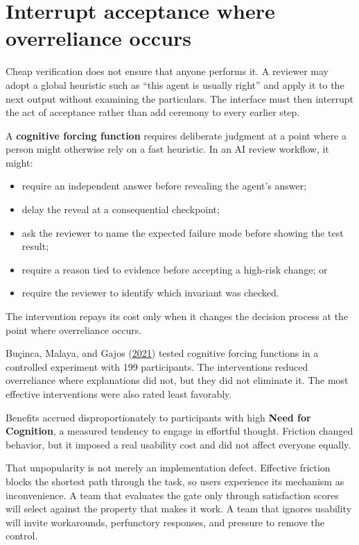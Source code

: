 \hypertarget{interrupt-acceptance-where-overreliance-occurs}{%
\section{Interrupt acceptance where overreliance occurs}\label{interrupt-acceptance-where-overreliance-occurs}}

Cheap verification does not ensure that anyone performs it. A reviewer may adopt a global heuristic such as ``this agent is usually right'' and apply it to the next output without examining the particulars. The interface must then interrupt the act of acceptance rather than add ceremony to every earlier step.


A \textbf{cognitive forcing function} requires deliberate judgment at a point where a person might otherwise rely on a fast heuristic. In an AI review workflow, it might:

\begin{itemize}
\tightlist
\item
  require an independent answer before revealing the agent's answer;
\item
  delay the reveal at a consequential checkpoint;
\item
  ask the reviewer to name the expected failure mode before showing the test result;
\item
  require a reason tied to evidence before accepting a high-risk change; or
\item
  require the reviewer to identify which invariant was checked.
\end{itemize}

The intervention repays its cost only when it changes the decision process at the point where overreliance occurs.

Buçinca, Malaya, and Gajos (\href{https://arxiv.org/abs/2102.09692}{2021}) tested cognitive forcing functions in a controlled experiment with 199 participants. The interventions reduced overreliance where explanations did not, but they did not eliminate it. The most effective interventions were also rated least favorably.

Benefits accrued disproportionately to participants with high \textbf{Need for Cognition}, a measured tendency to engage in effortful thought. Friction changed behavior, but it imposed a real usability cost and did not affect everyone equally.

That unpopularity is not merely an implementation defect. Effective friction blocks the shortest path through the task, so users experience its mechanism as inconvenience. A team that evaluates the gate only through satisfaction scores will select against the property that makes it work. A team that ignores usability will invite workarounds, perfunctory responses, and pressure to remove the control.

